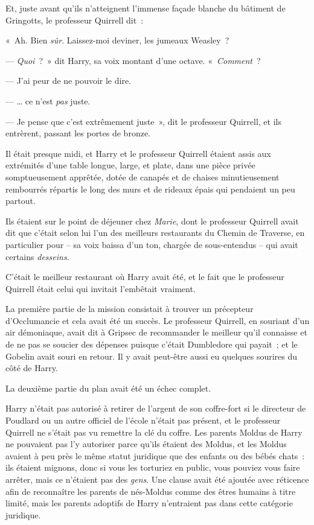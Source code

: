 Et, juste avant qu'ils n'atteignent l'immense façade blanche du bâtiment de Gringotts, le professeur Quirrell dit~:

«~Ah. Bien \emph{sûr}. Laissez-moi deviner, les jumeaux Weasley~?

--- \emph{Quoi}~?~» dit Harry, sa voix montant d'une octave. «~\emph{Comment}~?

--- J'ai peur de ne pouvoir le dire.

--- … ce n'est \emph{pas} juste.

--- Je pense que c'est extrêmement juste~», dit le professeur Quirrell, et ils entrèrent, passant les portes de bronze.

\later

Il était presque midi, et Harry et le professeur Quirrell étaient assis aux extrémités d'une table longue, large, et plate, dans une pièce privée somptueusement apprêtée, dotée de canapés et de chaises minutieusement rembourrés répartis le long des murs et de rideaux épais qui pendaient un peu partout.

Ils étaient sur le point de déjeuner chez \emph{Marie}, dont le professeur Quirrell avait dit que c'était selon lui l'un des meilleurs restaurants du Chemin de Traverse, en particulier pour -- sa voix baissa d'un ton, chargée de sous-entendus -- qui avait certains \emph{desseins}.

C'était le meilleur restaurant où Harry avait été, et le fait que le professeur Quirrell était celui qui invitait l'embêtait vraiment.

La première partie de la mission consistait à trouver un précepteur d'Occlumancie et cela avait été un succès. Le professeur Quirrell, en souriant d'un air démoniaque, avait dit à Gripsec de recommander le meilleur qu'il connaisse et de ne pas se soucier des dépenses puisque c'était Dumbledore qui payait~; et le Gobelin avait souri en retour. Il y avait peut-être aussi eu quelques sourires du côté de Harry.

La deuxième partie du plan avait été un échec complet.

Harry n'était pas autorisé à retirer de l'argent de son coffre-fort si le directeur de Poudlard ou un autre officiel de l'école n'était pas présent, et le professeur Quirrell ne s'était pas vu remettre la clé du coffre. Les parents Moldus de Harry ne pouvaient pas l'y autoriser parce qu'ils étaient des Moldus, et les Moldus avaient à peu près le même statut juridique que des enfants ou des bébés chats~: ils étaient mignons, donc si vous les torturiez en public, vous pouviez vous faire arrêter, mais ce n'étaient pas des \emph{gens}. Une clause avait été ajoutée avec réticence afin de reconnaître les parents de nés-Moldus comme des êtres humains à titre limité, mais les parents adoptifs de Harry n'entraient pas dans cette catégorie juridique.

